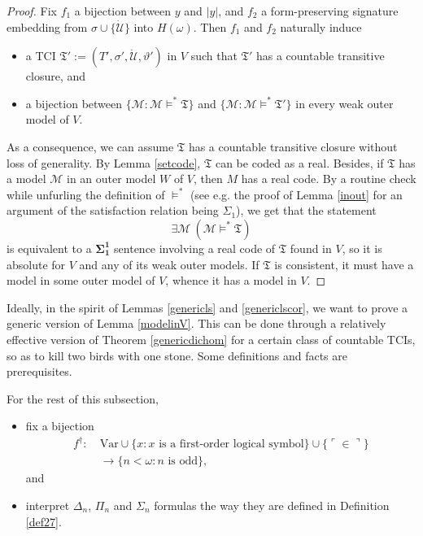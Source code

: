 \documentclass[12pt]{article}
\numberwithin{equation}{section}
\begin{document}
\begin{proof}
Fix $f_1$ a bijection between $y$ and $|y|$, and $f_2$ a form-preserving signature embedding from $\sigma \cup \{\dot{\mathcal{U}}\}$ into $H(\omega)$. Then $f_1$ and $f_2$ naturally induce
\begin{itemize}
    \item a TCI $\mathfrak{T}' := (T', \sigma', \dot{\mathcal{U}}, \vartheta')$ in $V$ such that $\mathfrak{T}'$ has a countable transitive closure, and
    \item a bijection between $\{\mathcal{M} : \mathcal{M} \models^* \mathfrak{T}\}$ and $\{\mathcal{M} : \mathcal{M} \models^* \mathfrak{T}'\}$ in every weak outer model of $V$.
\end{itemize}
As a consequence, we can assume $\mathfrak{T}$ has a countable transitive closure without loss of generality. By Lemma \ref{setcode}, $\mathfrak{T}$ can be coded as a real. Besides, if $\mathfrak{T}$ has a model $\mathcal{M}$ in an outer model $W$ of $V$, then $M$ has a real code. By a routine check while unfurling the definition of $\models^*$ (see e.g. the proof of Lemma \ref{inout} for an argument of the satisfaction relation being $\Sigma_1$), we get that the statement $$\exists \mathcal{M} \ (\mathcal{M} \models^* \mathfrak{T})$$ is equivalent to a $\mathbf{\Sigma^1_1}$ sentence involving a real code of $\mathfrak{T}$ found in $V$, so it is absolute for $V$ and any of its weak outer models. If $\mathfrak{T}$ is consistent, it must have a model in some outer model of $V$, whence it has a model in $V$.
\end{proof}

Ideally, in the spirit of Lemmas \ref{genericls} and \ref{genericlscor}, we want to prove a generic version of Lemma \ref{modelinV}. This can be done through a relatively effective version of Theorem \ref{genericdichom} for a certain class of countable TCIs, so as to kill two birds with one stone. Some definitions and facts are prerequisites.

For the rest of this subsection,
\begin{itemize}
    \item fix a bijection 
    \begin{align*}
        f^{\dagger} : \ & \mathrm{Var} \cup \{x : x \text{ is a first-order logical symbol}\} \cup \{\ulcorner \in \urcorner\} \\
        & \longrightarrow \{n < \omega : n \text{ is odd}\} \text{,}
    \end{align*}
    and
    \item interpret $\Delta_n$, $\Pi_n$ and $\Sigma_n$ formulas the way they are defined in Definition \ref{def27}.
\end{itemize}
\end{document}
